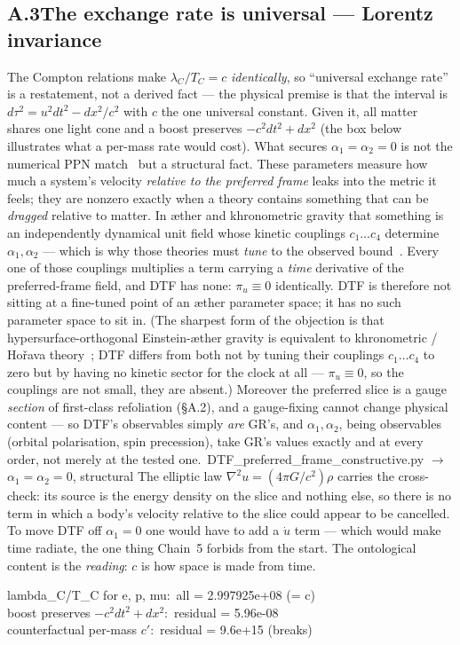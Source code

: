 \documentclass[11pt]{article}
\newcommand{\pychip}[2]{{\footnotesize\colorbox{cbPyBg}{\ttfamily\,#1\,}\,{\color{gray}$\to$ #2}}}
\begin{document}
\subsection*{A.3\quad The exchange rate is universal --- Lorentz invariance}
The Compton relations make $\lambda_C/T_C=c$ \emph{identically}, so ``universal exchange rate'' is a
restatement, not a derived fact --- the physical premise is that the interval is
$d\tau^2=u^2dt^2-dx^2/c^2$ with $c$ the one universal constant. Given it, all matter shares one light
cone and a boost preserves $-c^2dt^2+dx^2$ (the box below illustrates what a per-mass rate would cost).
What secures $\alpha_1=\alpha_2=0$ is not the numerical PPN match~\cite{Will2014} but a structural fact.
These parameters measure how much a system's velocity \emph{relative to the preferred frame} leaks into
the metric it feels; they are nonzero exactly when a theory contains something that can be \emph{dragged}
relative to matter. In \ae ther and khronometric gravity that something is an independently dynamical unit
field whose kinetic couplings $c_1\ldots c_4$ determine $\alpha_1,\alpha_2$ --- which is why those theories
must \emph{tune} to the observed bound~\cite{Jacobson2001}. Every one of those couplings multiplies a term
carrying a \emph{time} derivative of the preferred-frame field, and DTF has none: $\pi_u\equiv0$
identically. DTF is therefore not sitting at a fine-tuned point of an \ae ther parameter space; it has no
such parameter space to sit in. (The sharpest form of the objection is that hypersurface-orthogonal
Einstein-\ae ther gravity is equivalent to khronometric / Ho\v{r}ava theory~\cite{BlasPujolasSibiryakov2011};
DTF differs from both not by tuning their couplings $c_1\ldots c_4$ to zero but by having no kinetic sector
for the clock at all --- $\pi_u\equiv0$, so the couplings are not small, they are absent.) Moreover the
preferred slice is a gauge \emph{section} of first-class
refoliation (\S A.2), and a gauge-fixing cannot change physical content --- so DTF's observables simply
\emph{are} GR's, and $\alpha_1,\alpha_2$, being observables (orbital polarisation, spin precession), take
GR's values exactly and at every order, not merely at the tested one.
\pychip{DTF\_preferred\_frame\_constructive.py}{$\alpha_1=\alpha_2=0$, structural}
The elliptic law $\nabla^2u=(4\pi G/c^2)\rho$ carries the cross-check: its source is the energy density on
the slice and nothing else, so there is no term in which a body's velocity relative to the slice could
appear to be cancelled. To move DTF off $\alpha_1=0$ one would have to add a $\dot u$ term --- which would
make time radiate, the one thing Chain~5 forbids from the start. The ontological content is the
\emph{reading}: $c$ is how space is made from time.
\begin{tcolorbox}[colback=cbPyBg,colframe=cbNodeFr,boxrule=0.5pt,arc=2pt,left=8pt,right=8pt,top=4pt,bottom=4pt]
\ttfamily\small lambda\_C/T\_C for e, p, mu:\ all = 2.997925e+08 (= c)\\
boost preserves $-c^2dt^2+dx^2$:\ residual = 5.96e-08\\
counterfactual per-mass $c'$:\ residual = 9.6e+15 (breaks)
\end{tcolorbox}
\end{document}
